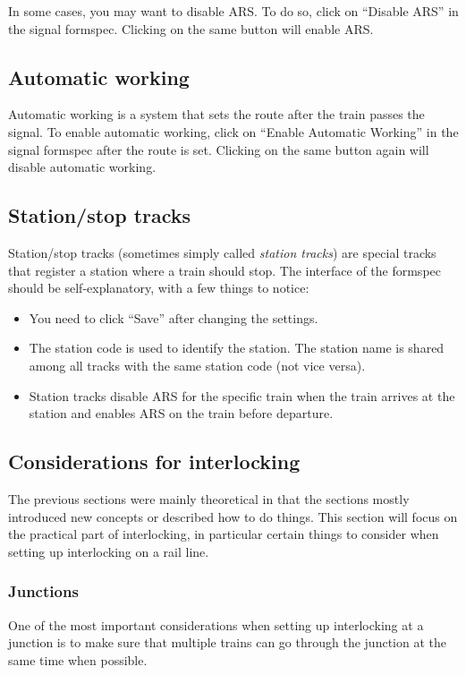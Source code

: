 \documentclass[notitlepage]{article}
\begin{document}
In some cases, you may want to disable ARS. To do so, click on ``Disable ARS'' in the signal formspec. Clicking on the same button will enable ARS.

\subsection{Automatic working}\label{s:ilaw}
Automatic working is a system that sets the route after the train passes the signal. To enable automatic working, click on ``Enable Automatic Working'' in the signal formspec after the route is set. Clicking on the same button again will disable automatic working.

\subsection{Station/stop tracks}\label{s:stoprail}
Station/stop tracks (sometimes simply called \textit{station tracks}) are special tracks that register a station where a train should stop. The interface of the formspec should be self-explanatory, with a few things to notice:
\begin{itemize}
\item You need to click ``Save'' after changing the settings.
\item The station code is used to identify the station. The station name is shared among all tracks with the same station code (not vice versa).
\item Station tracks disable ARS for the specific train when the train arrives at the station and enables ARS on the train before departure.
\end{itemize}

\subsection{Considerations for interlocking}\label{s:ilconsiderations}

The previous sections were mainly theoretical in that the sections mostly introduced new concepts or described how to do things. This section will focus on the practical part of interlocking, in particular certain things to consider when setting up interlocking on a rail line.

\subsubsection{Junctions}\label{s:iljunctions}

One of the most important considerations when setting up interlocking at a junction is to make sure that multiple trains can go through the junction at the same time when possible.
\end{document}

